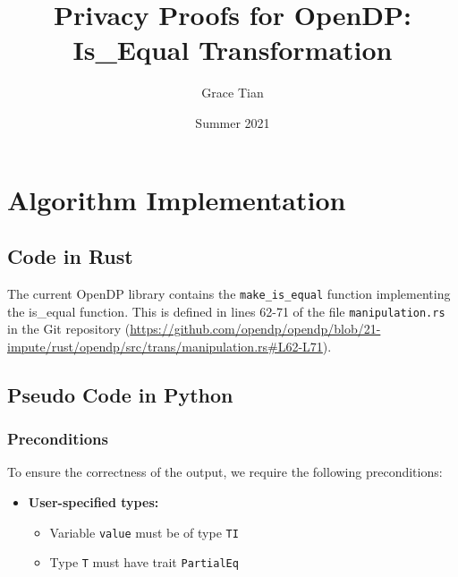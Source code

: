 

\newcommand{\silvia}[1]{{ {\color{blue}{(silvia)~#1}}}}
\newcommand{\grace}[1]{{ {\color{purple}{(grace)~#1}}}}
\newcommand{\connor}[1]{{ {\color{teal}{(connor)~#1}}}}
\newcommand{\mike}[1]{{ {\color{green}{(mike)~#1}}}}
\newcommand{\todo}{{\textcolor{red}{TODO }}}


\title{Privacy Proofs for OpenDP: Is\_Equal Transformation}
\author{Grace Tian}
\date{Summer 2021}



\maketitle
\tableofcontents

\section{Algorithm Implementation}
\subsection{Code in Rust}
The current OpenDP library contains the \texttt{make\_is\_equal} function implementing the is\_equal function. This is defined in lines 62-71 of the file \texttt{manipulation.rs} in the Git repository (\url{https://github.com/opendp/opendp/blob/21-impute/rust/opendp/src/trans/manipulation.rs#L62-L71}).

\subsection{Pseudo Code in Python}\label{sec:pseudocode}

\subsubsection*{Preconditions}
To ensure the correctness of the output, we require the following preconditions:

\begin{itemize}
    \item \textbf{User-specified types:}
    \begin{itemize}
        \item Variable \texttt{\texttt{value}} must be of type \texttt{TI}
        \item Type \texttt{T} must have trait \texttt{PartialEq}
    \end{itemize}
\end{itemize}

